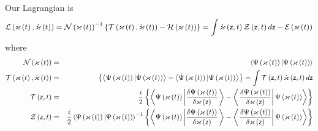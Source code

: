 Our Lagrangian is 
\begin{equation}
{\cal L}\left( {\cal \varkappa }\left( t\right) ,{\cal \dot{\varkappa}}%
\left( t\right) \right) ={\cal N}\left( {\cal \varkappa }\left( t\right)
\right) ^{-1}\left\{ {\cal T}\left( {\cal \varkappa }\left( t\right) ,{\cal 
\dot{\varkappa}}\left( t\right) \right) -{\cal H}\left( {\cal \varkappa }%
\left( t\right) \right) \right\} =\int {\cal \dot{\varkappa}}\left( {\sf z}%
,t\right) {\cal Z}\left( {\sf z},t\right) d{\sf z}-{\cal E}\left( {\cal %
\varkappa }\left( t\right) \right)
\end{equation}%
where 
\begin{eqnarray}
{\cal N}\left( {\cal \varkappa }\left( t\right) \right) &=&\left\langle \Psi
\left( {\cal \varkappa }\left( t\right) \right) |\Psi \left( {\cal \varkappa 
}\left( t\right) \right) \right\rangle \\
{\cal T}\left( {\cal \varkappa }\left( t\right) ,{\cal \dot{\varkappa}}%
\left( t\right) \right) &=&\left\{ \left\langle \Psi \left( {\cal \varkappa }%
\left( t\right) \right) |\dot{\Psi}\left( {\cal \varkappa }\left( t\right)
\right) \right\rangle -\left\langle \dot{\Psi}\left( {\cal \varkappa }\left(
t\right) \right) |\Psi \left( {\cal \varkappa }\left( t\right) \right)
\right\rangle \right\} =\int {\cal T}\left( {\sf z},t\right) {\cal \dot{%
\varkappa}}\left( {\sf z},t\right) d{\sf z} \\
{\cal T}\left( {\sf z},t\right) &=&\frac{i}{2}\left\{ \left\langle \Psi
\left( {\cal \varkappa }\left( t\right) \right) \left| \frac{\delta \Psi
\left( {\cal \varkappa }\left( t\right) \right) }{\delta {\cal \varkappa }%
\left( {\sf z}\right) }\right. \right\rangle -\left\langle \left. \frac{%
\delta \Psi \left( {\cal \varkappa }\left( t\right) \right) }{\delta {\cal %
\varkappa }\left( {\sf z}\right) }\right| \Psi \left( {\cal \varkappa }%
\left( t\right) \right) \right\rangle \right\} \\
{\cal Z}\left( {\sf z},t\right) &=&\frac{i}{2}\left\langle \Psi \left( {\cal %
\varkappa }\left( t\right) \right) |\Psi \left( {\cal \varkappa }\left(
t\right) \right) \right\rangle ^{-1}\left\{ \left\langle \Psi \left( {\cal %
\varkappa }\left( t\right) \right) \left| \frac{\delta \Psi \left( {\cal %
\varkappa }\left( t\right) \right) }{\delta {\cal \varkappa }\left( {\sf z}%
\right) }\right. \right\rangle -\left\langle \left. \frac{\delta \Psi \left( 
{\cal \varkappa }\left( t\right) \right) }{\delta {\cal \varkappa }\left( 
{\sf z}\right) }\right| \Psi \left( {\cal \varkappa }\left( t\right) \right)
\right\rangle \right\} \\

\end{eqnarray}
